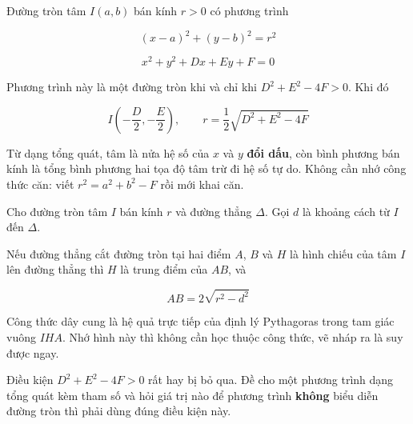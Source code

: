 \documentclass[11pt, a4paper]{article}
\begin{document}
\begin{dinhnghia}
Đường tròn tâm $I(a, b)$ bán kính $r > 0$ có phương trình

$$(x - a)^2 + (y - b)^2 = r^2$$
\end{dinhnghia}
\begin{dinhnghia}
$$x^2 + y^2 + Dx + Ey + F = 0$$

Phương trình này là một đường tròn khi và chỉ khi $D^2 + E^2 - 4F > 0$. Khi đó

$$I\left(-\frac{D}{2}, -\frac{E}{2}\right), \qquad r = \frac{1}{2}\sqrt{D^2 + E^2 - 4F}$$

 Từ dạng tổng quát, tâm là nửa hệ số của $x$ và $y$ \textbf{đổi dấu}, còn bình phương bán kính là tổng bình phương hai tọa độ tâm trừ đi hệ số tự do. Không cần nhớ công thức căn: viết $r^2 = a^2 + b^2 - F$ rồi mới khai căn.
\end{dinhnghia}
\begin{dinhly}
Cho đường tròn tâm $I$ bán kính $r$ và đường thẳng $\Delta$. Gọi $d$ là khoảng cách từ $I$ đến $\Delta$.

\end{dinhly}
\begin{dinhly}
Nếu đường thẳng cắt đường tròn tại hai điểm $A$, $B$ và $H$ là hình chiếu của tâm $I$ lên đường thẳng thì $H$ là trung điểm của $AB$, và

$$AB = 2\sqrt{r^2 - d^2}$$

 Công thức dây cung là hệ quả trực tiếp của định lý Pythagoras trong tam giác vuông $IHA$. Nhớ hình này thì không cần học thuộc công thức, vẽ nháp ra là suy được ngay.

 Điều kiện $D^2 + E^2 - 4F > 0$ rất hay bị bỏ qua. Đề cho một phương trình dạng tổng quát kèm tham số và hỏi giá trị nào để phương trình \textbf{không} biểu diễn đường tròn thì phải dùng đúng điều kiện này.

\end{dinhly}
\end{document}
